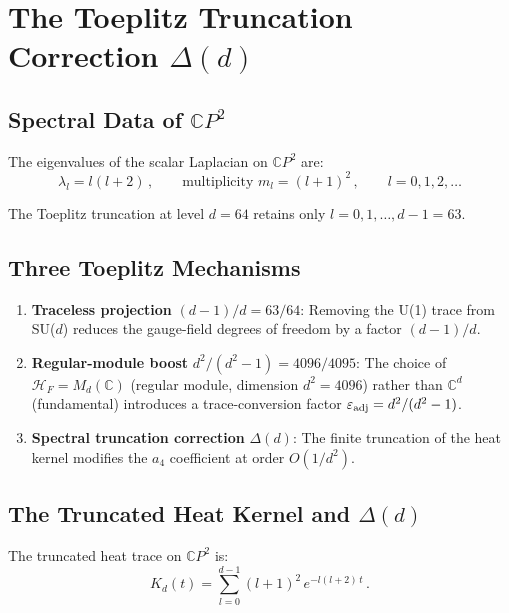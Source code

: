 \documentclass[12pt,a4paper]{article}
\theoremstyle{definition}
\begin{document}
\section{The Toeplitz Truncation Correction $\Delta(d)$}
\label{sec:toeplitz}

\subsection{Spectral Data of $\mathbb{C}P^2$}

The eigenvalues of the scalar Laplacian on $\mathbb{C}P^2$ are:
\begin{equation}
\lambda_l = l(l+2)\,,\qquad
\text{multiplicity } m_l = (l+1)^2\,,\qquad l = 0, 1, 2, \ldots
\end{equation}

The Toeplitz truncation at level $d = 64$ retains only
$l = 0, 1, \ldots, d-1 = 63$.

\subsection{Three Toeplitz Mechanisms}

\begin{enumerate}
\item \textbf{Traceless projection} $(d{-}1)/d = 63/64$:
  Removing the U(1) trace from SU($d$) reduces the gauge-field
  degrees of freedom by a factor $(d{-}1)/d$.

\item \textbf{Regular-module boost} $d^2/(d^2{-}1) = 4096/4095$:
  The choice of $\mathcal{H}_F = M_d(\mathbb{C})$ (regular module,
  dimension $d^2 = 4096$) rather than $\mathbb{C}^d$ (fundamental)
  introduces a trace-conversion factor $\varepsilon_{\rm adj} = d^2/(d^2-1)$.

\item \textbf{Spectral truncation correction} $\Delta(d)$:
  The finite truncation of the heat kernel modifies the $a_4$
  coefficient at order $O(1/d^2)$.
\end{enumerate}

\subsection{The Truncated Heat Kernel and $\Delta(d)$}

The truncated heat trace on $\mathbb{C}P^2$ is:
\begin{equation}
K_d(t) = \sum_{l=0}^{d-1} (l+1)^2\,e^{-l(l+2)\,t}\,.
\end{equation}
\end{document}
